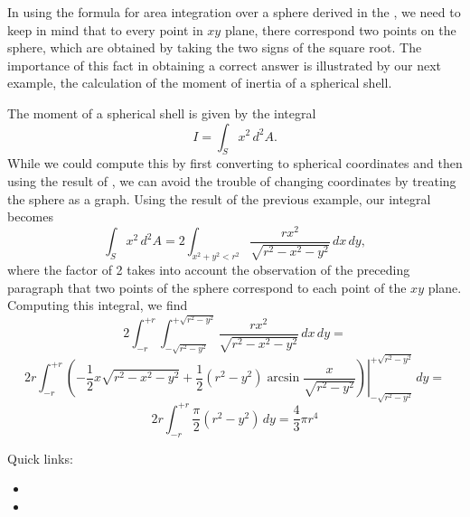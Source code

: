 \documentclass[12pt]{article}
\begin{document}
In using the formula for area integration over a sphere derived in the , we need to keep in mind that to every point in $xy$ plane, there correspond two points on the sphere, which are obtained by taking the two signs of the square root.  The importance of this fact in obtaining a correct answer is illustrated by our next example, the calculation of the moment of inertia of a spherical shell.

The moment of a spherical shell is given by the integral
 $$I = \int_S x^2 \, d^2 A.$$
While we could compute this by first converting to spherical coordinates and then using the result of , we can avoid the trouble of changing coordinates by treating the sphere as a graph.  Using the result of the previous example, our integral becomes
 $$\int_S x^2 \, d^2 A = 2 \int_{x^2 + y^2 < r^2} \frac{r x^2}{\sqrt{ r^2 - x^2 - y^2 }} \, dx \, dy,$$
where the factor of 2 takes into account the observation of the preceding paragraph that two points of the sphere correspond to each point of the $xy$ plane.  Computing this integral, we find
 $$2 \int_{-r}^{+r} \int_{-\sqrt{r^2 - y^2}}^{+\sqrt{r^2 - y^2}} \frac{r x^2}{\sqrt{ r^2 - x^2 - y^2}} \, dx \, dy =$$
 $$2r \int_{-r}^{+r} \left( \left. -\frac{1}{2} x \sqrt{ r^2 - x^2 - y^2} + \frac{1}{2} (r^2 - y^2) \arcsin \frac{x}{\sqrt{ r^2 - y^2 }} \right) \right|_{-\sqrt{r^2 - y^2}}^{+\sqrt{r^2 - y^2}}  \, dy =$$
 $$2r \int_{-r}^{+r} \frac{\pi}{2} (r^2 - y^2) \, dy = \frac{4}{3} \pi r^4$$

Quick links:
\begin{itemize}
\item {}
\item {}
\end{itemize}
\end{document}
